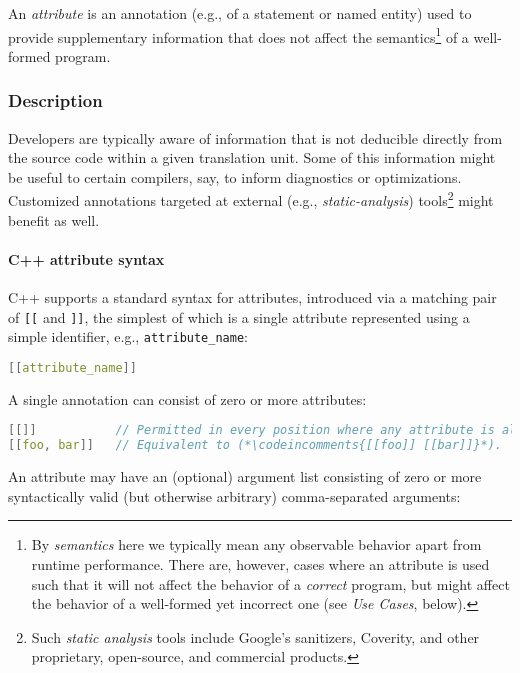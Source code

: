 \documentclass[twoside,10pt,letterpaper,usenames]{newstyle-PearsonGeneric-7-38}
\newcommand{\codeincomments}{\color{skyblue}\ttfamily}
\newcommand{\intraref}[1]{\textit{#1}}
\begin{document}
An \emph{attribute} is an annotation (e.g., of a statement or named
{entity}) used to provide supplementary information that does not affect
the semantics{\cprotect\footnote{By \emph{semantics} here we typically
  mean any observable behavior apart from runtime performance. There
  are, however, cases where an attribute is used such that it will not
  affect the behavior of a \emph{correct} program, but might affect the
  behavior of a well-formed yet incorrect one (see \intraref{Use Cases},
  below).}} of a well-formed program.

\subsubsection[Description]{Description}\label{description}

Developers are typically aware of information that is not deducible
directly from the source code within a given translation unit. Some of
this information might be useful to certain compilers, say, to inform
diagnostics or optimizations. Customized annotations targeted at
external (e.g., \emph{static-analysis}) tools{\cprotect\footnote{Such
  \emph{static analysis} tools include Google's sanitizers, Coverity,
  and other proprietary, open-source, and commercial products.}} might
benefit as well.

\paragraph[C++ attribute syntax]{C++ attribute syntax}\label{c++-attribute-syntax}

C++ supports a standard syntax for attributes, introduced via a matching
pair of \texttt{[[} and \texttt{]]}, the simplest of which is a single
attribute represented using a simple identifier, e.g.,
\texttt{attribute\_name}:

\begin{lstlisting}[language=C++]
[[attribute_name]]
\end{lstlisting}
    

A single annotation can consist of zero or more attributes:

\begin{lstlisting}[language=C++]
[[]]           // Permitted in every position where any attribute is allowed.
[[foo, bar]]   // Equivalent to (*\codeincomments{[[foo]] [[bar]]}*).
\end{lstlisting}
    

An attribute may have an (optional) argument list consisting of zero or
more syntactically valid (but otherwise arbitrary) comma-separated
arguments:
\end{document}
